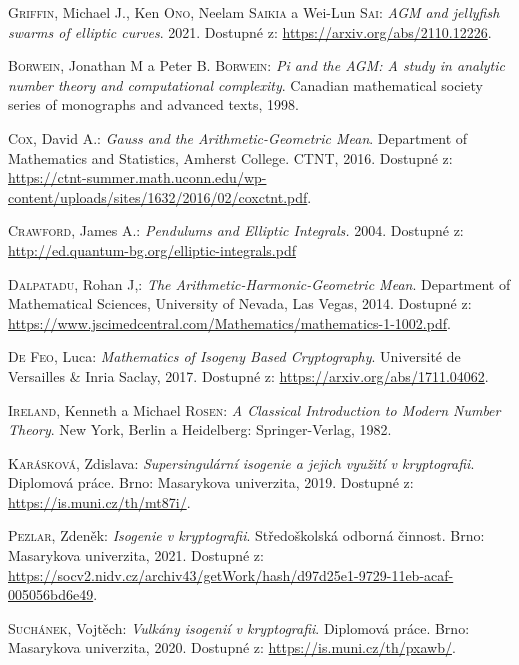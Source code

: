 \documentclass[12pt]{report}
\begin{document}
\begin{thebibliography}{97}


\textsc{Griffin}, Michael J., Ken \textsc{Ono}, Neelam \textsc{Saikia} a Wei-Lun \textsc{Sai}: \textit{AGM and jellyfish swarms of elliptic curves}. 2021. Dostupné z: \url{https://arxiv.org/abs/2110.12226}.

\textsc{Borwein}, Jonathan M a Peter B. \textsc{Borwein}: \textit{Pi and the AGM: A study in analytic number theory and computational complexity}. Canadian mathematical society series of monographs and advanced texts, 1998.

\textsc{Cox}, David A.: \textit{Gauss and the Arithmetic-Geometric Mean}. Department of Mathematics and Statistics, Amherst College. CTNT, 2016. Dostupné z: \url{https://ctnt-summer.math.uconn.edu/wp-content/uploads/sites/1632/2016/02/coxctnt.pdf}.

\textsc{Crawford}, James A.: \textit{Pendulums and Elliptic Integrals.} 2004. Dostupné z: \url{http://ed.quantum-bg.org/elliptic-integrals.pdf}

\textsc{Dalpatadu}, Rohan J,: \textit{The Arithmetic-Harmonic-Geometric Mean}. Department of Mathematical Sciences, University of Nevada, Las Vegas, 2014. Dostupné z: \url{https://www.jscimedcentral.com/Mathematics/mathematics-1-1002.pdf}.

\textsc{De Feo}, Luca: \textit{Mathematics of Isogeny Based Cryptography}. Université de Versailles \& Inria Saclay, 2017. Dostupné z: \url{https://arxiv.org/abs/1711.04062}.

\textsc{Ireland}, Kenneth a Michael \textsc{Rosen}: \textit{A Classical Introduction to Modern Number Theory}. New York, Berlin a Heidelberg: Springer-Verlag, 1982.


\textsc{Karásková}, Zdislava: \textit{Supersingulární isogenie a jejich využití v kryptografii}. Diplomová práce. Brno: Masarykova univerzita, 2019. Dostupné z:  \url{https://is.muni.cz/th/mt87i/}.

\textsc{Pezlar}, Zdeněk: \textit{Isogenie v kryptografii}. Středoškolská odborná činnost. Brno: Masarykova univerzita, 2021. Dostupné z: \url{https://socv2.nidv.cz/archiv43/getWork/hash/d97d25e1-9729-11eb-acaf-005056bd6e49}.


\textsc{Suchánek}, Vojtěch: \textit{Vulkány isogenií v kryptografii}. Diplomová práce. Brno: Masarykova univerzita, 2020. Dostupné z: \url{https://is.muni.cz/th/pxawb/}.



\end{thebibliography}
\end{document}
